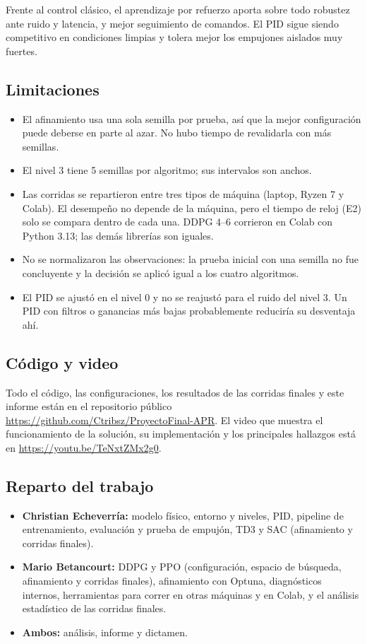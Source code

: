 \documentclass[11pt,a4paper]{article}
\begin{document}
Frente al control clásico, el aprendizaje por refuerzo aporta sobre todo robustez ante ruido y latencia, y mejor seguimiento de comandos. El PID sigue siendo competitivo en condiciones limpias y tolera mejor los empujones aislados muy fuertes.

\subsection*{Limitaciones}

\begin{itemize}
  \item El afinamiento usa una sola semilla por prueba, así que la mejor configuración puede deberse en parte al azar. No hubo tiempo de revalidarla con más semillas.
  \item El nivel 3 tiene 5 semillas por algoritmo; sus intervalos son anchos.
  \item Las corridas se repartieron entre tres tipos de máquina (laptop, Ryzen 7 y Colab). El desempeño no depende de la máquina, pero el tiempo de reloj (E2) solo se compara dentro de cada una. DDPG 4--6 corrieron en Colab con Python 3.13; las demás librerías son iguales.
  \item No se normalizaron las observaciones: la prueba inicial con una semilla no fue concluyente y la decisión se aplicó igual a los cuatro algoritmos.
  \item El PID se ajustó en el nivel 0 y no se reajustó para el ruido del nivel 3. Un PID con filtros o ganancias más bajas probablemente reduciría su desventaja ahí.
\end{itemize}

\subsection*{Código y video}

Todo el código, las configuraciones, los resultados de las corridas finales y este informe están en el repositorio público \url{https://github.com/Ctribsz/ProyectoFinal-APR}. El video que muestra el funcionamiento de la solución, su implementación y los principales hallazgos está en \url{https://youtu.be/TeNxtZMx2g0}.

\subsection*{Reparto del trabajo}

\begin{itemize}
  \item \textbf{Christian Echeverría:} modelo físico, entorno y niveles, PID, pipeline de entrenamiento, evaluación y prueba de empujón, TD3 y SAC (afinamiento y corridas finales).
  \item \textbf{Mario Betancourt:} DDPG y PPO (configuración, espacio de búsqueda, afinamiento y corridas finales), afinamiento con Optuna, diagnósticos internos, herramientas para correr en otras máquinas y en Colab, y el análisis estadístico de las corridas finales.
  \item \textbf{Ambos:} análisis, informe y dictamen.
\end{itemize}
\end{document}
